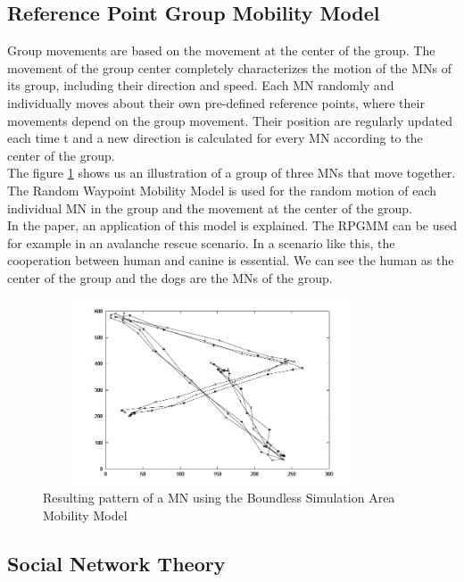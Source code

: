 \newpage

\subsection{Reference Point Group Mobility Model}

Group movements are based on the movement at the center of the group. The movement of the group center completely characterizes the motion of the MNs of its group, including their direction and speed. Each MN randomly and individually moves about their own pre-defined reference points, where their movements depend on the group movement. Their position are regularly updated each time t and a new direction is calculated for every MN according to the center of the group.\\
The figure \ref{RPGMMFig} shows us an illustration of a group of three MNs that move together. The Random Waypoint Mobility Model is used for the random motion of each individual MN in the group and the movement at the center of the group.\\
In the paper, an application of this model is explained. The RPGMM can be used for example in an avalanche rescue scenario. In a scenario like this, the cooperation between human and canine is essential. We can see the human as the center of the group and the dogs are the MNs of the group.\\

\begin{figure}[h]
\center
\includegraphics[width=10cm,height=55mm]{../images/rpgmmodel1.png}
\caption{\label{RPGMMFig}Resulting pattern of a MN using the Boundless Simulation Area Mobility Model\cite{SurveyMobilityModelsAdHoc1}}
\end{figure}

\newpage

\subsection{Social Network Theory}


